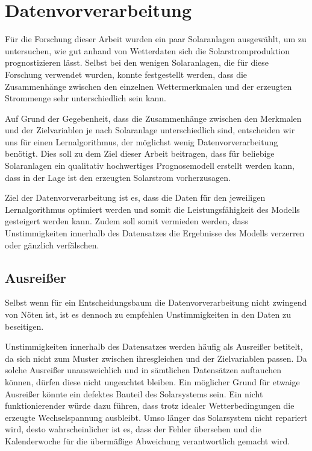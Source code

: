 \documentclass[12pt, a4paper]{article}
\begin{document}
\section{Datenvorverarbeitung}

Für die Forschung dieser Arbeit wurden ein paar Solaranlagen ausgewählt, um zu untersuchen, wie gut anhand von Wetterdaten sich die Solarstromproduktion prognostizieren lässt. Selbst bei den wenigen Solaranlagen, die für diese Forschung verwendet wurden, konnte festgestellt werden, dass die Zusammenhänge zwischen den einzelnen Wettermerkmalen und der erzeugten Strommenge sehr unterschiedlich sein kann.

Auf Grund der Gegebenheit, dass die Zusammenhänge zwischen den Merkmalen und der Zielvariablen je nach Solaranlage unterschiedlich sind, entscheiden wir uns für einen Lernalgorithmus, der möglichst wenig Datenvorverarbeitung benötigt. Dies soll zu dem Ziel dieser Arbeit beitragen, dass für beliebige Solaranlagen ein qualitativ hochwertiges Prognosemodell erstellt werden kann, dass in der Lage ist den erzeugten Solarstrom vorherzusagen.

Ziel der Datenvorverarbeitung ist es, dass die Daten für den jeweiligen Lernalgorithmus optimiert werden und somit die Leistungsfähigkeit des Modells gesteigert werden kann. Zudem soll somit vermieden werden, dass Unstimmigkeiten innerhalb des Datensatzes die Ergebnisse des Modells verzerren oder gänzlich verfälschen.

\subsection{Ausreißer}

Selbst wenn für ein Entscheidungsbaum die Datenvorverarbeitung nicht zwingend von Nöten ist, ist es dennoch zu empfehlen Unstimmigkeiten in den Daten zu beseitigen.

Unstimmigkeiten innerhalb des Datensatzes werden häufig als Ausreißer betitelt, da sich nicht zum Muster zwischen ihresgleichen und der Zielvariablen passen. Da solche Ausreißer unausweichlich und in sämtlichen Datensätzen auftauchen können, dürfen diese nicht ungeachtet bleiben. Ein möglicher Grund für etwaige Ausreißer könnte ein defektes Bauteil des Solarsystems sein. Ein nicht funktionierender würde dazu führen, dass trotz idealer Wetterbedingungen die erzeugte Wechselspannung ausbleibt. Umso länger das Solarsystem nicht repariert wird, desto wahrscheinlicher ist es, dass der Fehler übersehen und die Kalenderwoche für die übermäßige Abweichung verantwortlich gemacht wird.
\end{document}
